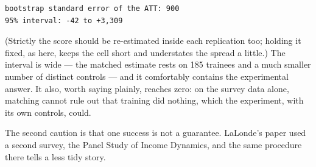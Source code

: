 \documentclass[
  letterpaper,
  10pt,
  twoside,
  openright,
  numbers=noenddot,
  chapterprefix=true]{scrbook}
\begin{document}
\begin{verbatim}
bootstrap standard error of the ATT: 900
95% interval: -42 to +3,309
\end{verbatim}

(Strictly the score should be re-estimated inside each replication too;
holding it fixed, as here, keeps the cell short and understates the
spread a little.) The interval is wide --- the matched estimate rests on
185 trainees and a much smaller number of distinct controls --- and it
comfortably contains the experimental answer. It also, worth saying
plainly, reaches zero: on the survey data alone, matching cannot rule
out that training did nothing, which the experiment, with its own
controls, could.

The second caution is that one success is not a guarantee. LaLonde's
paper used a second survey, the Panel Study of Income Dynamics, and the
same procedure there tells a less tidy story.
\end{document}
